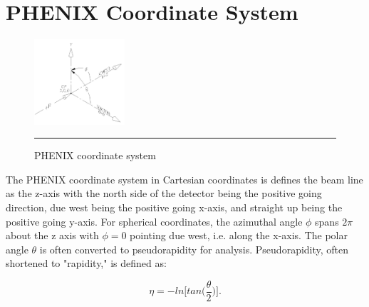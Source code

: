 \appendix
\chapter{PHENIX Coordinate System} %

\begin{figure}[htbp!]
  \centering
    \includegraphics[width=0.3\textwidth]{Figures/coord2.jpg}
    \rule{35em}{0.5pt}
  \caption[PHENIX coordinate system]{PHENIX coordinate system}
  \label{fig:PHENIXcoord}
\end{figure}

The PHENIX coordinate system in Cartesian coordinates is defines the beam line as the z-axis with the north side of the detector being the positive going direction, due west being the positive going x-axis, and straight up being the positive going y-axis. For spherical coordinates, the azimuthal angle $\phi$ spans $2\pi$ about the z axis with $\phi=0$ pointing due west, i.e. along the x-axis. The polar angle $\theta$ is often converted to pseudorapidity for analysis. Pseudorapidity, often shortened to "rapidity," is defined as:

\begin{equation}
\eta = - ln \bigg[ tan \bigg( \frac{\theta}{2} \bigg) \bigg].
\end{equation}

